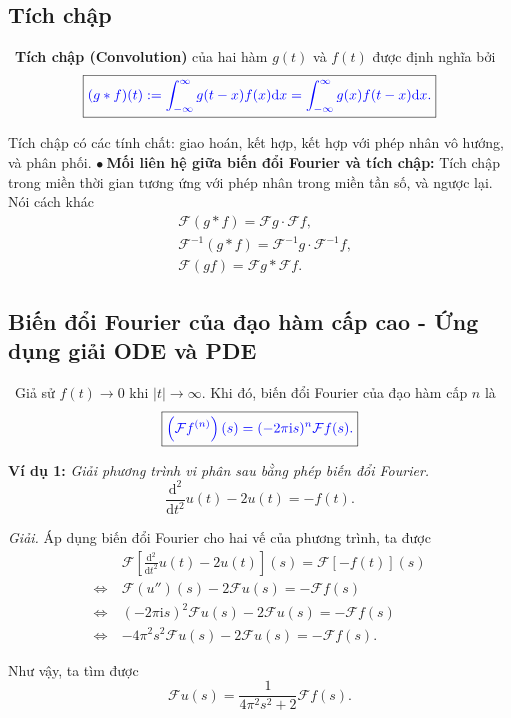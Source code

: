 \documentclass[10pt, a4paper]{article}
\begin{document}
	\subsection{Tích chập}
	\vspace{2mm}
	\quad\,\,\,\textbf{\color{red}Tích chập (Convolution)} của hai hàm $g(t)$ và $f(t)$ được định nghĩa bởi $$\boxed{\color{blue}(g*f)(t):=\displaystyle\int_{-\infty}^\infty g(t-x)f(x)\text{d}x=\displaystyle\int_{-\infty}^\infty g(x)f(t-x)\text{d}x.}$$
	
	Tích chập có các tính chất: giao hoán, kết hợp, kết hợp với phép nhân vô hướng, và phân phối.\vskip7pt
	$\bullet~$\textbf{Mối liên hệ giữa biến đổi Fourier và tích chập:} Tích chập trong miền thời gian tương ứng với phép nhân trong miền tần số, và ngược lại. Nói cách khác\begin{align*}
		&\mathcal F(g*f)=\mathcal Fg\cdot\mathcal Ff,\\
		&\mathcal F^{-1}(g*f)=\mathcal F^{-1}g\cdot\mathcal F^{-1}f,\\
		&\mathcal F(gf)=\mathcal Fg*\mathcal Ff.
	\end{align*}
	\subsection{Biến đổi Fourier của đạo hàm cấp cao - Ứng dụng giải ODE và PDE}
	\vspace{2mm}
	\quad\,\,\,Giả sử $f(t)\rightarrow0$ khi $|t|\rightarrow\infty$. Khi đó, biến đổi Fourier của đạo hàm cấp $n$ là $$\boxed{\color{blue}\left(\mathcal Ff^{(n)}\right)(s)=(-2\pi\text{i}s)^n\mathcal Ff(s).}$$
	
	\textbf{Ví dụ 1:} \textit{Giải phương trình vi phân sau bằng phép biến đổi Fourier.} $$\frac{\mathrm d^2}{\mathrm dt^2}u(t)-2u(t)=-f(t).$$
	
	\textit{Giải.} Áp dụng biến đổi Fourier cho hai vế của phương trình, ta được \begin{align*}
		&\mathcal F\left[\frac{\mathrm d^2}{\mathrm dt^2}u(t)-2u(t)\right](s)=\mathcal F[-f(t)](s)\\
		\Leftrightarrow~&\mathcal F(u'')(s)-2\mathcal Fu(s)=-\mathcal Ff(s)\\
		\Leftrightarrow~&(-2\pi\mathrm is)^2\mathcal Fu(s)-2\mathcal Fu(s)=-\mathcal Ff(s)\\
		\Leftrightarrow~&-4\pi^2s^2\mathcal Fu(s)-2\mathcal Fu(s)=-\mathcal Ff(s).
	\end{align*}
	
	Như vậy, ta tìm được $$\mathcal Fu(s)=\frac{1}{4\pi^2s^2+2}\mathcal Ff(s).$$
	
\end{document}
